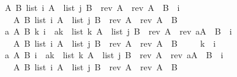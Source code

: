 \documentclass[twoside,runningheads,envcountsame,envcountsect,oribibl,orivec]{llncs}
\begin{document}
\begin{figure}
\begin{isabellebody}
{\isasymlbrakk}{\isacharparenleft}A\ B{\isachardot}\ {\isacharparenleft}list\ {\isacharbackquote}i\ A\ {\isacharasterisk}\ list\ {\isacharbackquote}j\ B{\isacharparenright}\ \ {\isacharparenleft}rev\ A{\isacharparenright}\ {\isacharequal}\ {\isacharparenleft}rev\ A{\isacharparenright}\ {\isacharat}\ B{\isacharparenright}\ \ {\isacharbackquote}i\ {\isasymnoteq}\ {}{\isacharcomma}\ \isanewline
\ \ A\ B{\isachardot}\ {\isacharparenleft}list\ {\isacharbackquote}i\ A\ {\isacharasterisk}\ list\ {\isacharbackquote}j\ B{\isacharparenright}\ \ {\isacharparenleft}rev\ A{\isacharparenright}\ {\isacharequal}\ {\isacharparenleft}rev\ A{\isacharparenright}\ {\isacharat}\ B\ {\isasymrbrakk}
\isanewline\ \ \ {\isasymsqsubseteq}\hfill \isanewline
{\isasymlbrakk}{\isacharparenleft}a\ A\ B\ k{\isachardot}\ {\isacharparenleft}{\isacharbackquote}i\ {\isacharbrackleft}{\isasymmapsto}{\isacharbrackright}\ {\isacharbrackleft}a{\isacharcomma}k{\isacharbrackright}\ {\isacharasterisk}\ list\ k\ A\ {\isacharasterisk}\ list\ {\isacharbackquote}j\ B{\isacharparenright}\ \ {\isacharparenleft}rev\ A{\isacharparenright}\ {\isacharequal}\ {\isacharparenleft}rev\ {\isacharparenleft}a{\isacharhash}A{\isacharparenright}{\isacharparenright}\ {\isacharat}\ B{\isacharparenright}\ \ {\isacharbackquote}i\ {\isasymnoteq}\ {}{\isacharcomma}\ \isanewline
\ \ A\ B{\isachardot}\ {\isacharparenleft}list\ {\isacharbackquote}i\ A\ {\isacharasterisk}\ list\ {\isacharbackquote}j\ B{\isacharparenright}\ \ {\isacharparenleft}rev\ A{\isacharparenright}\ {\isacharequal}\ {\isacharparenleft}rev\ A{\isacharparenright}\ {\isacharat}\ B\ {\isasymrbrakk}
\isanewline\ \ \ {\isasymsqsubseteq}\hfill \isanewline
{\isacharbackquote}k\ {\isacharcolon}{\isacharequal}\ {\isacharat}{\isacharparenleft}{\isacharbackquote}i\ {\isacharplus}\ {}{\isacharparenright}{\isacharsemicolon}\isanewline
{\isasymlbrakk}{\isacharparenleft}a\ A\ B{\isachardot}\ {\isacharparenleft}{\isacharbackquote}i\ {\isacharbrackleft}{\isasymmapsto}{\isacharbrackright}\ {\isacharbrackleft}a{\isacharcomma}{\isacharbackquote}k{\isacharbrackright}\ {\isacharasterisk}\ list\ {\isacharbackquote}k\ A\ {\isacharasterisk}\ list\ {\isacharbackquote}j\ B{\isacharparenright}\ \ {\isacharparenleft}rev\ A{\isacharparenright}\ {\isacharequal}\ {\isacharparenleft}rev\ {\isacharparenleft}a{\isacharhash}A{\isacharparenright}{\isacharparenright}\ {\isacharat}\ B{\isacharparenright}\ \ {\isacharbackquote}i\ {\isasymnoteq}\ {}{\isacharcomma}\ \isanewline
\ \ A\ B{\isachardot}\ {\isacharparenleft}list\ {\isacharbackquote}i\ A\ {\isacharasterisk}\ list\ {\isacharbackquote}j\ B{\isacharparenright}\ \ {\isacharparenleft}rev\ A{\isacharparenright}\ {\isacharequal}\ {\isacharparenleft}rev\ A{\isacharparenright}\ {\isacharat}\ B\ {\isasymrbrakk}

\end{isabellebody}
\end{figure}
\end{document}
